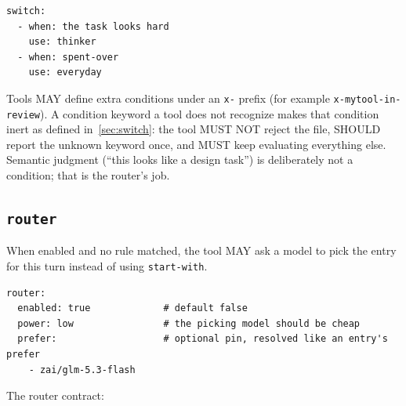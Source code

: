 \documentclass[11pt]{article}
\newcommand{\key}[1]{\texttt{#1}}
\begin{document}
\begin{lstlisting}
switch:
  - when: the task looks hard
    use: thinker
  - when: spent-over
    use: everyday
\end{lstlisting}

Tools MAY define extra conditions under an \key{x-} prefix (for example
\key{x-mytool-in-review}). A condition keyword a tool does not recognize
makes that condition inert as defined in~\ref{sec:switch}: the tool MUST NOT
reject the file, SHOULD report the unknown keyword once, and MUST keep
evaluating everything else. Semantic judgment (``this looks like a design
task'') is deliberately not a condition; that is the router's job.

\subsection{\texorpdfstring{\key{router}}{router}}
\label{sec:router}

When enabled and no rule matched, the tool MAY ask a model to pick the
entry for this turn instead of using \key{start-with}.

\begin{lstlisting}
router:
  enabled: true             # default false
  power: low                # the picking model should be cheap
  prefer:                   # optional pin, resolved like an entry's prefer
    - zai/glm-5.3-flash
\end{lstlisting}

The router contract:
\end{document}

